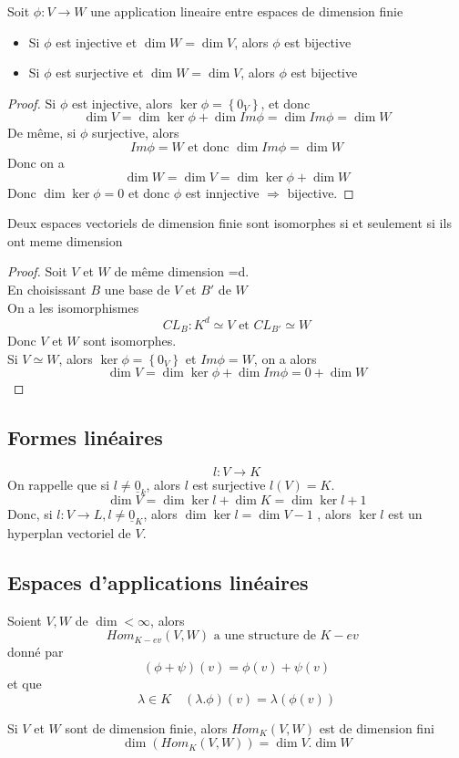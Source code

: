 \documentclass[../main.tex]{subfiles}
\begin{document}
\begin{crly}
	Soit $\phi:V \to W$ une application lineaire entre espaces de dimension finie
	\begin{itemize}
	\item Si $\phi$ est injective et $\dim W = \dim V$, alors $\phi$ est bijective
	\item Si $\phi$ est surjective et $\dim W = \dim V$, alors $\phi$ est bijective
	\end{itemize}
	
\end{crly}
\begin{proof}
Si $\phi$ est injective, alors $\ker \phi = \left\{ 0_V \right\} $, et donc
\[ 
\dim V = \dim \ker \phi + \dim Im \phi = \dim Im \phi = \dim W
\]
De même, si $\phi$ surjective, alors
\[ 
Im \phi = W \text{ et donc } \dim Im \phi = \dim W
\]
Donc on a
\[ 
\dim W = \dim V = \dim \ker \phi + \dim W
\]
Donc $\dim \ker \phi = 0$ et donc $\phi$ est innjective $\Rightarrow$ bijective.

\end{proof}
\begin{crly}
	Deux espaces vectoriels de dimension finie sont isomorphes si et seulement si ils ont meme dimension
\end{crly}
\begin{proof}
Soit $V$ et $W$ de même dimension =d.\\
En choisissant $B$ une base de $V$ et $B'$ de $W$\\
On a les isomorphismes
\[ 
CL_B: K^{d}\simeq V \text{ et } CL_{B'} \simeq W
\]
Donc $V$ et $W$ sont isomorphes.\\
Si $V \simeq W$, alors $\ker \phi = \left\{ 0_V \right\}$ et $Im \phi = W$, on a alors
\[ 
\dim V = \dim \ker \phi + \dim Im \phi = 0+ \dim W
\]

\end{proof}
\subsection{Formes linéaires}
\[ 
l: V \to K
\]
On rappelle que si $l \neq \underline{0}_k$, alors $l$ est surjective $l( V) = K$.\\
\[ 
\dim V = \dim \ker l + \dim K = \dim \ker l + 1
\]
Donc, si $l: V \to L, l \neq \underline{0}_K$, alors $\dim \ker l = \dim V -1$ , alors $\ker l$ est un hyperplan vectoriel de $V$.
\subsection{Espaces d'applications linéaires}
Soient $V,W$ de $\dim < \infty $, alors
\[ 
	Hom_{K-ev} ( V,W) \text{ a une structure de $K-ev$  }
\]
donné par 
\[ 
	( \phi + \psi) ( v)  = \phi( v) + \psi( v) 
\]
et que
\[ 
	\lambda \in K \quad ( \lambda. \phi  ) ( v)  = \lambda( \phi( v) ) 
\]
\begin{thm}
	Si $V$ et $W$ sont de dimension finie, alors $Hom_K ( V,W) $ est de dimension fini
	\[ 
		\dim ( Hom_K( V,W) ) = \dim V . \dim W
	\]
	
\end{thm}
\end{document}
